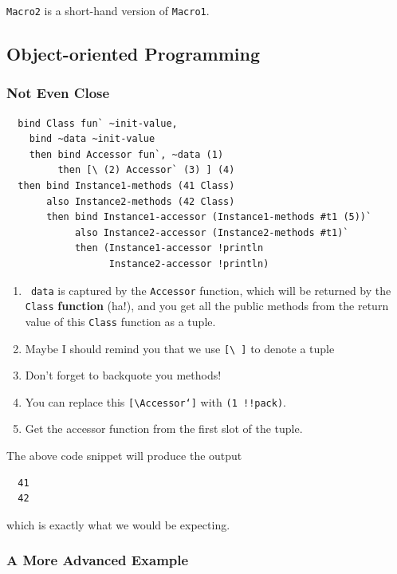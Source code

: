 \documentclass{report}
\newcommand{\mtilde}[1]{\textasciitilde}
\newcommand{\marg}[1]{\texttt{\mtilde ~#1}}
\begin{document}
\texttt{Macro2} is a short-hand version of \texttt{Macro1}.

\subsection{Object-oriented Programming}

\subsubsection{Not Even Close}

\begin{mdframed}[style=example]
\begin{verbatim}
  bind Class fun` ~init-value,
    bind ~data ~init-value
    then bind Accessor fun`, ~data (1)
         then [\ (2) Accessor` (3) ] (4)
  then bind Instance1-methods (41 Class)
       also Instance2-methods (42 Class)
       then bind Instance1-accessor (Instance1-methods #t1 (5))`
            also Instance2-accessor (Instance2-methods #t1)`
            then (Instance1-accessor !println
                  Instance2-accessor !println)
\end{verbatim}
\end{mdframed}

\begin{enumerate}
\item \marg{data} is captured by the \texttt{Accessor} function, which will be returned by the \texttt{Class} \textbf{function} (ha!), and you get all the public methods from the return value of this \texttt{Class} function as a tuple.
\item Maybe I should remind you that we use \texttt{[\textbackslash ~]} to denote a tuple
\item Don't forget to backquote you methods!
\item You can replace this \texttt{[\textbackslash Accessor`]} with \texttt{(1 !!pack)}.
\item Get the accessor function from the first slot of the tuple.
\end{enumerate}

The above code snippet will produce the output
\begin{verbatim}
  41
  42
\end{verbatim}

which is exactly what we would be expecting.

\subsubsection{A More Advanced Example}
\end{document}
